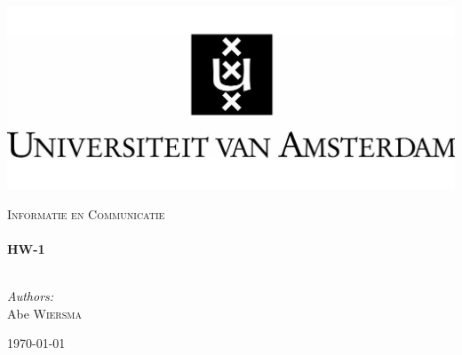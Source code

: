 \begin{titlepage}

\begin{flushleft}
\includegraphics[trim=0mm 0mm 0mm 0mm, width=1\textwidth]{./logo.jpg}\\
\end{flushleft}
\begin{center}
	\textsc{\Large Informatie en Communicatie}\\[0.5cm]

    \HRule \\[0.4cm] { \huge \bfseries HW-1}\\[0.4cm]

    \HRule \\[1.5cm]

\begin{minipage}{0.4\textwidth}
\begin{flushleft} \large \emph{Authors:}\\
Abe \textsc{Wiersma}\\
\end{flushleft}
\end{minipage}
\begin{minipage}{0.4\textwidth} \begin{flushright} \large \end{flushright}\end{minipage}

    \vfill

    {\large \today}

\end{center}
\end{titlepage}
\pagebreak